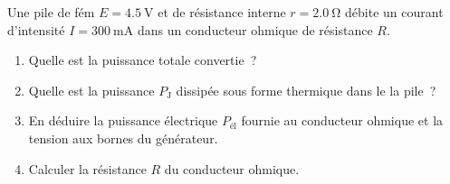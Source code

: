 Une pile de fém $E=\qty{4,5}{\volt}$ et de résistance interne
$r=\qty{2,0}{\ohm}$ débite un courant d'intensité $I=\qty{300}{\mA}$ dans un
conducteur ohmique de résistance $R$.
\begin{enumerate}
    \item Quelle est la puissance totale convertie~?
    \item Quelle est la puissance $P_{\mathrm{J}}$ dissipée sous forme thermique
          dans le la pile~?
    \item En déduire la puissance électrique $P_{\text{él}}$ fournie au
          conducteur ohmique et la tension aux bornes du générateur.
    \item Calculer la résistance $R$ du conducteur ohmique.
\end{enumerate}

